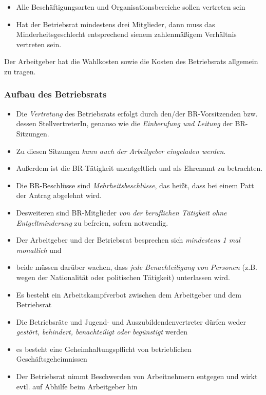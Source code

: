 \documentclass[a4paper, 12pt]{report}
\begin{document}
\begin{multicols}{2}
\begin{itemize}
    \item Alle Beschäftigungsarten und Organisationsbereiche sollen vertreten
	sein
    \item Hat der Betriebsrat mindestens drei Mitglieder, dann muss das
	Minderheitsgeschlecht entsprechend sienem zahlenmäßigem Verhältnis
	vertreten sein.
\end{itemize}

Der Arbeitgeber hat die Wahlkosten sowie die Kosten des Betriebsrats allgemein
zu tragen. \\

\subsubsection{Aufbau des Betriebsrats}

\begin{itemize}
    \item Die \emph{Vertretung} des Betriebsrats erfolgt durch den/der
	BR-Vorsitzenden bzw. dessen StellvertreterIn, genauso wie die
	\emph{Einberufung und Leitung} der BR-Sitzungen.
    \item Zu diesen Sitzungen \emph{kann auch der Arbeitgeber eingeladen
	werden}.
    \item Außerdem ist die BR-Tätigkeit unentgeltlich und als Ehrenamt zu
	betrachten.
    \item Die BR-Beschlüsse sind \emph{Mehrheitsbeschlüsse}, das heißt,
	dass bei einem Patt der Antrag abgelehnt wird.
    \item Desweiteren sind BR-Mitglieder \emph{von der beruflichen Tätigkeit
	ohne Entgeltminderung} zu befreien, sofern notwendig.
    \item Der Arbeitgeber und der Betriebsrat besprechen sich \emph{mindestens
	1 mal monatlich} und
    \item beide müssen darüber wachen, dass \emph{jede Benachteiligung von
	Personen} (z.B. wegen der Nationalität oder politischen Tätigkeit)
	unterlassen wird.
    \item Es besteht ein Arbeitskampfverbot zwischen dem Arbeitgeber und dem
	Betriebsrat
    \item Die Betriebsräte und Jugend- und Auszubildendenvertreter dürfen weder
	\emph{gestört, behindert, benachteiligt oder begünstigt} werden
    \item es besteht eine Geheimhaltungspflicht von betrieblichen
	Geschäftsgeheimnissen
    \item Der Betriebsrat nimmt Beschwerden von Arbeitnehmern entgegen und wirkt
	evtl. auf Abhilfe beim Arbeitgeber hin
\end{itemize}


\end{multicols}
\end{document}

